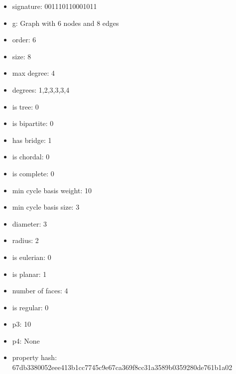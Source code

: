 \begin{itemize}
\item signature: 001110110001011
\item g: Graph with 6 nodes and 8 edges
\item order: 6
\item size: 8
\item max degree: 4
\item degrees: 1,2,3,3,3,4
\item is tree: 0
\item is bipartite: 0
\item has bridge: 1
\item is chordal: 0
\item is complete: 0
\item min cycle basis weight: 10
\item min cycle basis size: 3
\item diameter: 3
\item radius: 2
\item is eulerian: 0
\item is planar: 1
\item number of faces: 4
\item is regular: 0
\item p3: 10
\item p4: None
\item property hash: 67db3380052eee413b1cc7745c9e67ca369f8cc31a3589b0359280de761b1a02
\end{itemize}
\newpage
\begin{figure}
\end{figure}
